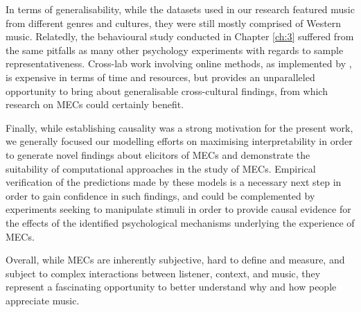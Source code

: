 In terms of generalisability, while the datasets used in our research featured music from different genres and cultures, they were still mostly comprised of Western music. Relatedly, the behavioural study conducted in Chapter \ref{ch:3} suffered from the same pitfalls as many other psychology experiments with regards to sample representativeness. Cross-lab work involving online methods, as implemented by \textcite{jacoby2021}, is expensive in terms of time and resources, but provides an unparalleled opportunity to bring about generalisable cross-cultural findings, from which research on MECs could certainly benefit.

Finally, while establishing causality was a strong motivation for the present work, we generally focused our modelling efforts on maximising interpretability in order to generate novel findings about elicitors of MECs and demonstrate the suitability of computational approaches in the study of MECs. Empirical verification of the predictions made by these models is a necessary next step in order to gain confidence in such findings, and could be complemented by experiments seeking to manipulate stimuli in order to provide causal evidence for the effects of the identified psychological mechanisms underlying the experience of MECs.

Overall, while MECs are inherently subjective, hard to define and measure, and subject to complex interactions between listener, context, and music, they represent a fascinating opportunity to better understand why and how people appreciate music.
